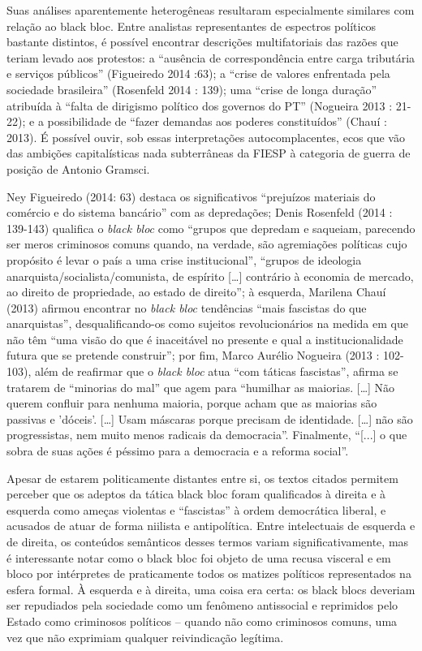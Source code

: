 Suas análises aparentemente heterogêneas resultaram especialmente
similares com relação ao black bloc. Entre analistas representantes de
espectros políticos bastante distintos, é possível encontrar descrições
multifatoriais das razões que teriam levado aos protestos: a ``ausência
de correspondência entre carga tributária e serviços públicos''
(Figueiredo 2014 :63); a ``crise de valores enfrentada pela sociedade
brasileira'' (Rosenfeld 2014 : 139); uma ``crise de longa duração''
atribuída à ``falta de dirigismo político dos governos do PT'' (Nogueira
2013 : 21-22); e a possibilidade de ``fazer demandas aos poderes
constituídos'' (Chauí : 2013). É possível ouvir, sob essas
interpretações autocomplacentes, ecos que vão das ambições
capitalísticas nada subterrâneas da FIESP à categoria de guerra de
posição de Antonio Gramsci.

Ney Figueiredo (2014: 63) destaca os significativos ``prejuízos
materiais do comércio e do sistema bancário'' com as depredações; Denis
Rosenfeld (2014 : 139-143) qualifica o \emph{black bloc} como ``grupos
que depredam e saqueiam, parecendo ser meros criminosos comuns quando,
na verdade, são agremiações políticas cujo propósito é levar o país a
uma crise institucional'', ``grupos de ideologia
anarquista/socialista/comunista, de espírito {[}\ldots{}{]} contrário à
economia de mercado, ao direito de propriedade, ao estado de direito'';
à esquerda, Marilena Chauí (2013) afirmou encontrar no \emph{black bloc}
tendências ``mais fascistas do que anarquistas'', desqualificando-os
como sujeitos revolucionários na medida em que não têm ``uma visão do
que é inaceitável no presente e qual a institucionalidade futura que se
pretende construir''; por fim, Marco Aurélio Nogueira (2013 : 102-103),
além de reafirmar que o \emph{black bloc} atua ``com táticas
fascistas'', afirma se tratarem de ``minorias do mal'' que agem para
``humilhar as maiorias. {[}\ldots{}{]} Não querem confluir para nenhuma
maioria, porque acham que as maiorias são passivas e 'dóceis'.
{[}\ldots{}{]} Usam máscaras porque precisam de identidade.
{[}\ldots{}{]} não são progressistas, nem muito menos radicais da
democracia''. Finalmente, ``{[}...{]} o que sobra de suas ações é
péssimo para a democracia e a reforma social''.

Apesar de estarem politicamente distantes entre si, os textos citados
permitem perceber que os adeptos da tática black bloc foram qualificados
à direita e à esquerda como ameças violentas e ``fascistas'' à ordem
democrática liberal, e acusados de atuar de forma niilista e
antipolítica. Entre intelectuais de esquerda e de direita, os conteúdos
semânticos desses termos variam significativamente, mas é interessante
notar como o black bloc foi objeto de uma recusa visceral e em bloco por
intérpretes de praticamente todos os matizes políticos representados na
esfera formal. À esquerda e à direita, uma coisa era certa: os black
blocs deveriam ser repudiados pela sociedade como um fenômeno
antissocial e reprimidos pelo Estado como criminosos políticos -- quando
não como criminosos comuns, uma vez que não exprimiam qualquer
reivindicação legítima.

